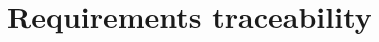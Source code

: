 \documentclass[DD.tex]{subfiles}
\begin{document}
\section{Requirements traceability}
\newpage
\end{document}
